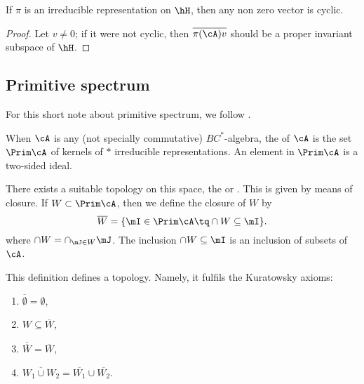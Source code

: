 \begin{lemma}
If $\pi$ is an irreducible representation on $\hH$, then any non zero vector is cyclic.
\end{lemma}

\begin{proof}
Let $v\neq 0$; if it were not cyclic, then $\overline{ \pi(\cA)v}$ should be a proper invariant  subspace of $\hH$.
\end{proof}

\subsection{Primitive spectrum}
For this short note about primitive spectrum, we follow \cite{Landi}.

When $\cA$ is any (not specially commutative) $BC^*$-algebra, the  of $\cA$ is the set $\Prim\cA$ of kernels of $*$ irreducible representations. An element in $\Prim\cA$ is a two-sided ideal.

There exists a suitable topology on this space, the  or . This is given by means of closure. If $W\subset\Prim\cA$, then we define the closure of $W$ by
\begin{equation}
  \overline{ W }=\{ \mI\in\Prim\cA\tq \cap W\subseteq \mI \}.
\end{equation}
where $\cap W=\cap_{\mJ\in W}\mJ$. The inclusion $\cap W\subseteq\mI$ is an inclusion of subsets of $\cA$.

\begin{proposition}
This definition defines a topology. Namely, it fulfils the Kuratowsky axioms:

\begin{enumerate}
\item\label{enu802i} $\overline{ \emptyset }=\emptyset$,
\item \label{enu802ii} $W\subseteq\overline{ W }$,
\item \label{enu802iii} $\overline{ \overline{ W } }=\overline{ W }$,
\item \label{enu802iv} $\overline{ W_1\cup W_2 }=\overline{ W_1 }\cup\overline{ W_2 }$.
\end{enumerate}
\end{proposition}

